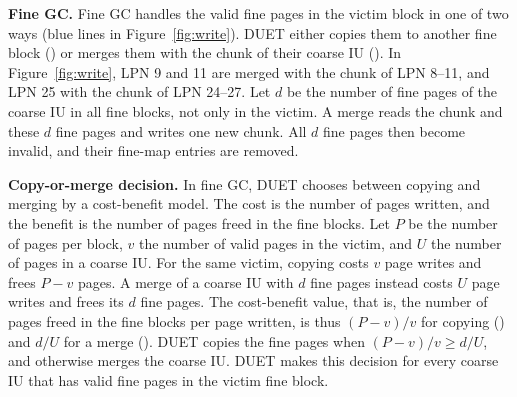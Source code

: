 \textbf{Fine GC.} Fine GC handles the valid fine pages in the victim block in one of two ways
(blue lines in Figure~\ref{fig:write}). DUET either copies them to
another fine block () or merges them with the chunk of their coarse IU ().
In Figure~\ref{fig:write}, LPN 9 and 11 are merged with the chunk of LPN 8--11,
and LPN 25 with the chunk of LPN 24--27. Let $d$ be the number of fine pages
of the coarse IU in all fine blocks, not only in the victim. A merge reads the
chunk and these $d$ fine pages and writes one new chunk. All $d$ fine pages then
become invalid, and their fine-map entries are removed.

\textbf{Copy-or-merge decision.} In fine GC, DUET chooses between copying and merging by a cost-benefit model. The cost is the
number of pages written, and the benefit is the number of pages freed in the
fine blocks. Let $P$ be the number of pages per block, $v$ the number of valid
pages in the victim, and $U$ the number of pages in a coarse IU. For the same
victim, copying costs $v$ page writes and frees $P - v$ pages. A merge of a
coarse IU with $d$ fine pages instead costs $U$ page writes and
frees its $d$ fine pages. The cost-benefit value, that is, the number of pages
freed in the fine blocks per page written, is thus $(P-v)/v$ for copying
() and $d/U$ for a merge (). DUET copies the fine pages when
$(P-v)/v \ge d/U$, and otherwise merges the coarse IU. DUET makes this decision for
every coarse IU that has valid fine pages in the victim fine block.


